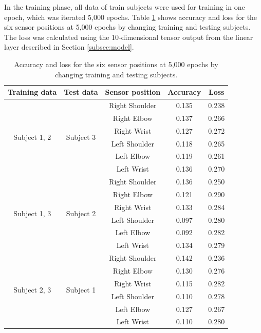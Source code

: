 \documentclass[graybox]{svmult}
\begin{document}
In the training phase, all data of train subjects were used for training in one epoch, which was iterated 5,000 epochs. Table \ref{tab:result} shows accuracy and loss for the six sensor positions at 5,000 epochs by changing training and testing subjects. The loss was calculated using the 10-dimensional tensor output from the linear layer described in Section \ref{subsec:model}.

\begin{table}[h]
    \centering
    \caption{Accuracy and loss for the six sensor positions at 5,000 epochs by changing training and testing subjects.}
    \label{tab:result}
    \begin{tabular}{c|c|c|c|c}\hline\hline
    Training data & Test data & Sensor position & Accuracy & Loss \\ \hline
    \multirow{6}{*}{Subject 1, 2} & \multirow{6}{*}{Subject 3} & Right Shoulder & 0.135 & 0.238 \\
    & & Right Elbow & 0.137 & 0.266 \\
    & & Right Wrist & 0.127 & 0.272 \\
    & & Left Shoulder & 0.118 & 0.265 \\
    & & Left Elbow & 0.119 & 0.261 \\
    & & Left Wrist & 0.136 & 0.270 \\ \cline{1-5}
    \multirow{6}{*}{Subject 1, 3} & \multirow{6}{*}{Subject 2} & Right Shoulder & 0.136 & 0.250 \\
    & & Right Elbow & 0.121 & 0.290 \\
    & & Right Wrist & 0.133 & 0.284 \\
    & & Left Shoulder & 0.097 & 0.280 \\
    & & Left Elbow & 0.092 & 0.282 \\
    & & Left Wrist & 0.134 & 0.279 \\ \cline{1-5}
    \multirow{6}{*}{Subject 2, 3} & \multirow{6}{*}{Subject 1} & Right Shoulder & 0.142 & 0.236 \\
    & & Right Elbow & 0.130 & 0.276 \\
    & & Right Wrist & 0.115 & 0.282 \\
    & & Left Shoulder & 0.110 & 0.278 \\
    & & Left Elbow & 0.127 & 0.267 \\
    & & Left Wrist & 0.110 & 0.280 \\ \hline
    \end{tabular}
\end{table}
\end{document}
